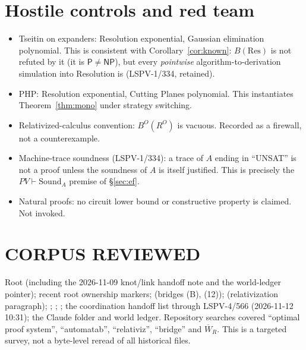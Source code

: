 \documentclass[11pt]{article}
\theoremstyle{definition}
\newcommand{\Pclass}{\mathsf{P}}
\newcommand{\NP}{\mathsf{NP}}
\newcommand{\Wb}{\overline W}
\begin{document}
\section{Hostile controls and red team}
\begin{itemize}
\item Tseitin on expanders: Resolution exponential, Gaussian elimination
polynomial. This is consistent with Corollary~\ref{cor:known}: $B(\mathrm{Res})$ is not
refuted by it (it is $\Pclass\ne\NP$), but every \emph{pointwise}
algorithm-to-derivation simulation into Resolution is (LSPV-1/334, retained).
\item PHP: Resolution exponential, Cutting Planes polynomial. This instantiates
Theorem~\ref{thm:mono} under strategy switching.
\item Relativized-calculus convention: $B^O(R^O)$ is vacuous. Recorded as a
firewall, not a counterexample.
\item Machine-trace soundness (LSPV-1/334): a trace of $A$ ending in
``UNSAT'' is not a proof unless the soundness of $A$ is itself justified. This is
precisely the $PV\vdash\mathrm{Sound}_A$ premise of \S\ref{sec:ef}.
\item Natural proofs: no circuit lower bound or constructive property is
claimed. Not invoked.
\end{itemize}

\section*{CORPUS REVIEWED}
Root  (including the 2026-11-09 knot/link handoff note and the
world-ledger pointer); recent root  ownership markers;
(bridges (B), (12)); 
(relativization paragraph);
;
;
;
the coordination handoff list through LSPV-4/566 (2026-11-12 10:31);
the Claude folder and world ledger. Repository searches covered
``optimal proof system'', ``automatab'', ``relativiz'', ``bridge'' and
$\Wb_R$. This is a targeted survey, not a byte-level reread of all
historical files.
\end{document}
